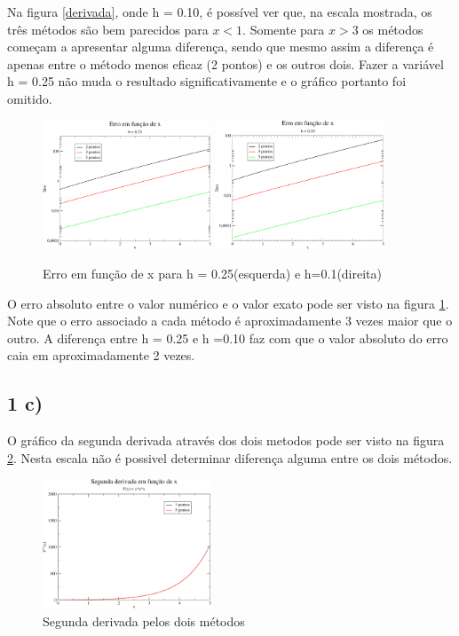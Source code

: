 \documentclass[a4wide]{report}
\begin{document}
Na figura \ref{derivada}, onde h = 0.10, é possível ver que, na escala mostrada, os três métodos são bem parecidos para $x < 1$. Somente para $x > 3$ os métodos começam a apresentar alguma diferença, sendo que mesmo assim a diferença é apenas entre o método menos eficaz (2 pontos) e os outros dois. Fazer a variável h = 0.25 não muda o resultado significativamente e o gráfico portanto foi omitido.

\begin{figure}[!htb]
\centering
\includegraphics[width=0.447\textwidth]{erroh2log.pdf}
\includegraphics[width=0.45\textwidth]{erroh1log.pdf}%
\caption{Erro em função de x para h = 0.25(esquerda) e h=0.1(direita)}
\label{erro}
\end{figure}


O erro absoluto entre o valor numérico e o valor exato pode ser visto na figura \ref{erro}. Note que o erro associado a cada método é aproximadamente 3 vezes maior que o outro. A diferença entre h = 0.25 e h =0.10 faz com que o valor absoluto do erro caia em aproximadamente 2 vezes. 





\subsection*{1 c) }


O gráfico da segunda derivada através dos dois metodos pode ser visto na figura \ref{derivada2}. Nesta escala não é possivel determinar diferença alguma entre os dois métodos.

\begin{figure}[!htb]
\centering
\includegraphics[width=0.447\textwidth]{derivada2h1.pdf}
\caption{Segunda derivada pelos dois métodos}
\label{derivada2}
\end{figure}
\end{document}

